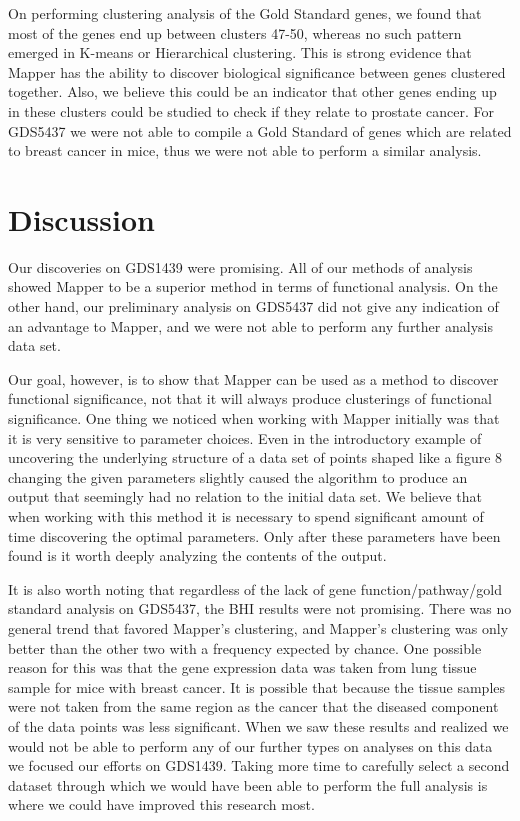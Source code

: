 \documentclass[preprint,10pt]{elsarticle}
\begin{document}
On performing clustering analysis of the Gold Standard genes, we found that most of the genes end up between clusters 47-50, whereas no such pattern emerged in K-means or Hierarchical clustering. This is strong evidence that Mapper has the ability to discover biological significance between genes clustered together. Also, we believe this could be an indicator that other genes ending up in these clusters could be studied to check if they relate to prostate cancer.
	For GDS5437 we were not able to compile a Gold Standard of genes which are related to breast cancer in mice, thus we were not able to perform a similar analysis.



\section{Discussion}
Our discoveries on GDS1439 were promising. All of our methods of analysis showed Mapper to be a superior method in terms of functional analysis. On the other hand, our preliminary analysis on GDS5437 did not give any indication of an advantage to Mapper, and we were not able to perform any further analysis data set. 

Our goal, however, is to show that Mapper can be used as a method to discover functional significance, not that it will always produce clusterings of functional significance. One thing we noticed when working with Mapper initially was that it is very sensitive to parameter choices. Even in the introductory example of uncovering the underlying structure of a data set of points shaped like a figure 8 changing the given parameters slightly caused the algorithm to produce an output that seemingly had no relation to the initial data set. We believe that when working with this method it is necessary to spend significant amount of time discovering the optimal parameters. Only after these parameters have been found is it worth deeply analyzing the contents of the output. 

	It is also worth noting that regardless of the lack of gene function/pathway/gold standard analysis on GDS5437, the BHI results were not promising. There was no general trend that favored Mapper's clustering, and Mapper's clustering was only better than the other two with a frequency expected by chance. One possible reason for this was that the gene expression data was taken from lung tissue sample for mice with breast cancer. It is possible that because the tissue samples were not taken from the same region as the cancer that the diseased component of the data points was less significant. When we saw these results and realized we would not be able to perform any of our further types on analyses on this data we focused our efforts on GDS1439. Taking more time to carefully select a second dataset through which we would have been able to perform the full analysis is where we could have improved this research most.
	
\end{document}
